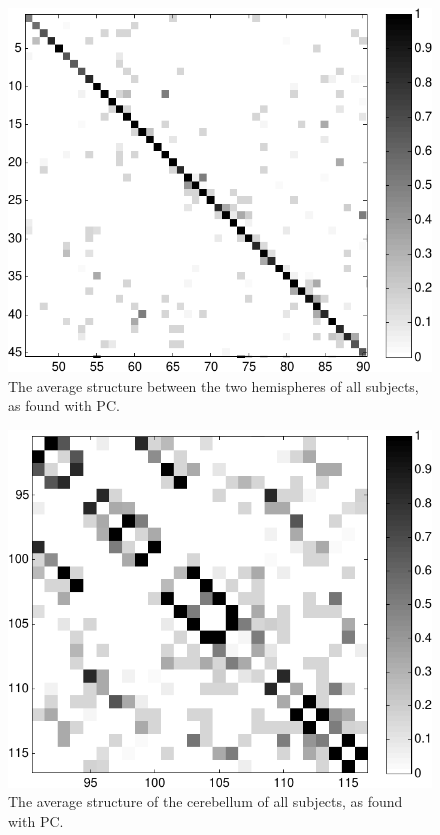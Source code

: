 \documentclass[a4paper, 10pt, english, onecolumn]{article}
\begin{document}
\begin{figure}[h!]
  \centering
  \includegraphics{images/struct_inter_hemisphere}
  \caption{The average structure between the two hemispheres of all subjects, as found with PC.}
  \label{fig:struct_inter_hemisphere}
\end{figure}
\begin{figure}[h!]
  \centering
  \includegraphics{images/struct_cerebellum}
  \caption{The average structure of the cerebellum of all subjects, as found with PC.}
  \label{fig:struct_cerebellum}
\end{figure}
\end{document}
